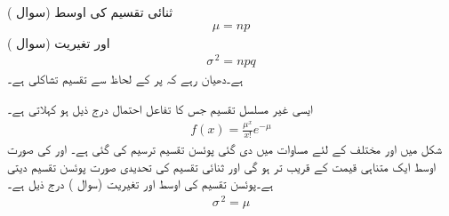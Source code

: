 ثنائی تقسیم کی اوسط (سوال )
\begin{align}\label{مساوات_شماریات_ثنائی_تقسیم_پ}
\mu=np
\end{align}
اور تغیریت  (سوال )
\begin{align}\label{مساوات_شماریات_ثنائی_تقسیم_ت}
\sigma^{\,2}=npq
\end{align}
ہے۔دھیان رہے کہ  پر  کے لحاظ سے تقسیم تشاکلی ہے۔

ایسی غیر مسلسل تقسیم جس کا تفاعل احتمال درج ذیل ہو  کہلاتی ہے۔ 
\begin{align}\label{مساوات_شماریات_پوئسن_تقسیم_الف}
f(x)=\frac{\mu^x}{x!}e^{-\mu}
\end{align}
شکل  میں  اور مختلف  کے لئے  مساوات  میں دی گئی پوئسن تقسیم ترسیم کی گئی ہے۔ اور  کی صورت اوسط  ایک متناہی قیمت کے قریب تر ہو گی اور  ثنائی تقسیم  کی  تحدیدی صورت  پوئسن تقسیم دیتی ہے۔پوئسن تقسیم کی اوسط  اور تغیریت (سوال ) درج ذیل ہے۔
\begin{align}\label{مساوات_شماریات_پوئسن_تقسیم_ب}
\sigma^{\,2}=\mu
\end{align}

